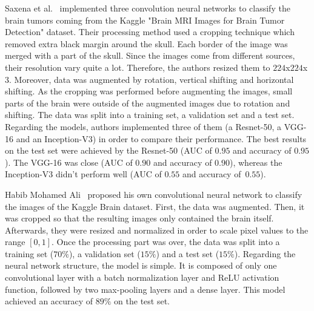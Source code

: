 Saxena et al.~\cite{31} implemented three convolution neural networks to classify the brain tumors coming from the Kaggle "Brain MRI Images for Brain Tumor Detection" dataset. Their processing method used a cropping technique which removed extra black margin around the skull. Each border of the image was merged with a part of the skull. Since the images come from different sources, their resolution vary quite a lot. Therefore, the authors resized them to $224$x$224$x$3$. Moreover, data was augmented by rotation, vertical shifting and horizontal shifting. As the cropping was performed before augmenting the images, small parts of the brain were outside of the augmented images due to rotation and shifting. The data was split into a training set, a validation set and a test set. Regarding the models, authors implemented three of them (a Resnet-50, a VGG-16 and an Inception-V3) in order to compare their performance. The best results on the test set were achieved by the Resnet-50 (AUC of $0.95$ and accuracy of $0.95$). The VGG-16 was close (AUC of $0.90$ and accuracy of $0.90$), whereas the Inception-V3 didn't perform well (AUC of $0.55$ and accuracy \mbox{of $0.55$}).

Habib Mohamed Ali~\cite{04} proposed his own convolutional neural network to classify the images of the Kaggle Brain dataset. First, the data was augmented. Then, it was cropped so that the resulting images only contained the brain itself. Afterwards, they were resized and normalized in order to scale pixel values to the range $[0,1]$. Once the processing part was over, the data was split into a training set ($70\%$), a validation set ($15\%$) and a test set ($15\%$). Regarding the neural network structure, the model is simple. It is composed of only one convolutional layer with a batch normalization layer and ReLU activation function, followed by two max-pooling layers and a dense layer. This model achieved an accuracy of $89\%$ on the test set.



